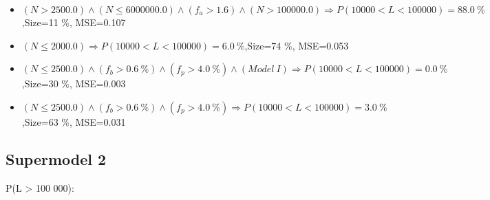 \documentclass[numbered]{CSL}
\begin{document}
\begin{itemize}
\item $(N > 2500.0) \land (N \leq 6000000.0) \land (f_a > 1.6) \land (N > 100000.0) \Rightarrow P(10 000 < L < 100 000) = 88.0~\%$,\hfill Size=11 \%, MSE=0.107
\item $(N \leq 2000.0) \Rightarrow P(10 000 < L < 100 000) = 6.0~\%$,\hfill Size=74 \%, MSE=0.053
\item $(N \leq 2500.0) \land (f_b > 0.6~\%) \land (f_p > 4.0~\%) \land (Model~I) \Rightarrow P(10 000 < L < 100 000) = 0.0~\%$,\hfill Size=30 \%, MSE=0.003
\item $(N \leq 2500.0) \land (f_b > 0.6~\%) \land (f_p > 4.0~\%) \Rightarrow P(10 000 < L < 100 000) = 3.0~\%$,\hfill Size=63 \%, MSE=0.031
\end{itemize}

\subsection{Supermodel 2}
P(L > 100 000):
\end{document}
